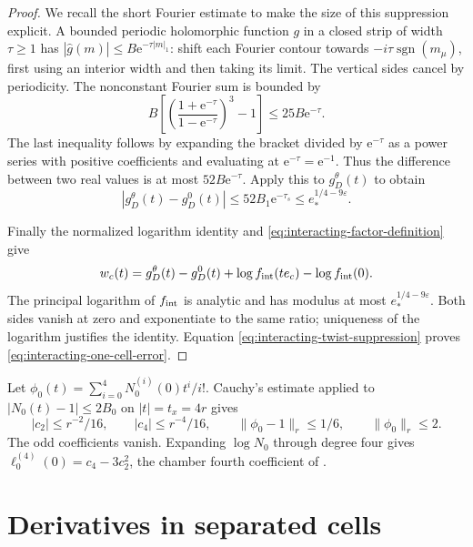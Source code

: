 \documentclass[11pt,letterpaper,reqno]{amsart}
\begin{document}
\begin{proof}
We recall the short Fourier estimate to make the
size of this suppression explicit. A bounded
periodic holomorphic function $g$ in a closed
strip of width $\tau\ge1$ has
$|\widehat g(m)|\le B \mathrm e^{-\tau|m|_1}$:
shift each Fourier contour towards
$-i\tau\operatorname{sgn}(m_\mu)$, first using
an interior width and then taking its limit.
The vertical sides cancel by periodicity.
The nonconstant Fourier sum is bounded by
\[
 B\left[\left(\frac{1+\mathrm e^{-\tau}}{1-\mathrm e^{-\tau}}\right)^3-1\right]
                                      \le25B\mathrm e^{-\tau}.
\]
The last inequality follows by expanding the
bracket divided by $\mathrm e^{-\tau}$ as a power
series with positive coefficients and evaluating
at $\mathrm e^{-\tau}=\mathrm e^{-1}$. Thus the difference
between two real values is at most $52B\mathrm e^{-\tau}$.
Apply this to $g_D^\theta(t)$ to obtain
\begin{equation}\label{eq:interacting-twist-suppression}
 |g_D^\theta(t)-g_D^0(t)|\le52B_1\mathrm e^{-\tau_s}
                                  \le e_*^{1/4-9\varepsilon}.
\end{equation}

Finally the normalized logarithm identity and
\eqref{eq:interacting-factor-definition} give
\[
 w_c(t)=g_D^\theta(t)-g_D^0(t)
                +\log f_{\rm int}(te_c)-\log f_{\rm int}(0).
\]
The principal logarithm of $f_{\rm int}$ is
analytic and has modulus at most
$e_*^{1/4-9\varepsilon}$. Both sides vanish
at zero and exponentiate to the same ratio;
uniqueness of the logarithm justifies the
identity. Equation
\eqref{eq:interacting-twist-suppression} proves
\eqref{eq:interacting-one-cell-error}.
\end{proof}

Let $\phi_0(t)=\sum_{i=0}^4N_0^{(i)}(0)t^i/i!$.
Cauchy's estimate applied to
$|N_0(t)-1|\le2B_0$ on $|t|=t_x=4r$ gives
\begin{equation}\label{eq:interacting-free-jet}
 |c_2|\le r^{-2}/16,\qquad |c_4|\le r^{-4}/16,\qquad
 \|\phi_0-1\|_r\le1/6,\qquad \|\phi_0\|_r\le2.
\end{equation}
The odd coefficients vanish. Expanding $\log N_0$
through degree four gives
$\ell_0^{(4)}(0)=c_4-3c_2^2$, the chamber fourth coefficient
of \cite[Theorem~B]{PositiveProbe}.

\section{Derivatives in separated cells}
\label{subsec:interacting-separated}
\end{document}
